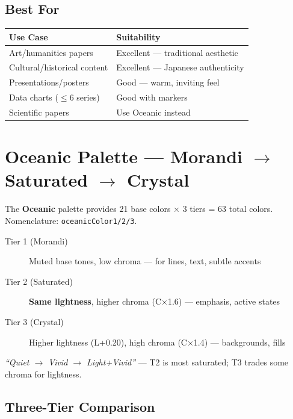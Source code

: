 \subsection*{Best For}

\begin{tabular}{ll}
    \toprule
    \textbf{Use Case} & \textbf{Suitability} \\
    \midrule
    Art/humanities papers & Excellent --- traditional aesthetic \\
    Cultural/historical content & Excellent --- Japanese authenticity \\
    Presentations/posters & Good --- warm, inviting feel \\
    Data charts ($\leq 6$ series) & Good with markers \\
    Scientific papers & Use Oceanic instead \\
    \bottomrule
\end{tabular}

\newpage
\section{Oceanic Palette --- Morandi \texorpdfstring{$\rightarrow$}{\textrightarrow} Saturated \texorpdfstring{$\rightarrow$}{\textrightarrow} Crystal}

The \textbf{Oceanic} palette provides 21 base colors × 3 tiers = 63 total colors. Nomenclature: \texttt{oceanicColor1/2/3}.

\begin{description}
    \item[Tier 1 (Morandi)] Muted base tones, low chroma --- for lines, text, subtle accents
    \item[Tier 2 (Saturated)] \textbf{Same lightness}, higher chroma (C×1.6) --- emphasis, active states
    \item[Tier 3 (Crystal)] Higher lightness (L+0.20), high chroma (C×1.4) --- backgrounds, fills
\end{description}

\textit{``Quiet $\rightarrow$ Vivid $\rightarrow$ Light+Vivid''} --- T2 is most saturated; T3 trades some chroma for lightness.

\subsection*{Three-Tier Comparison}

